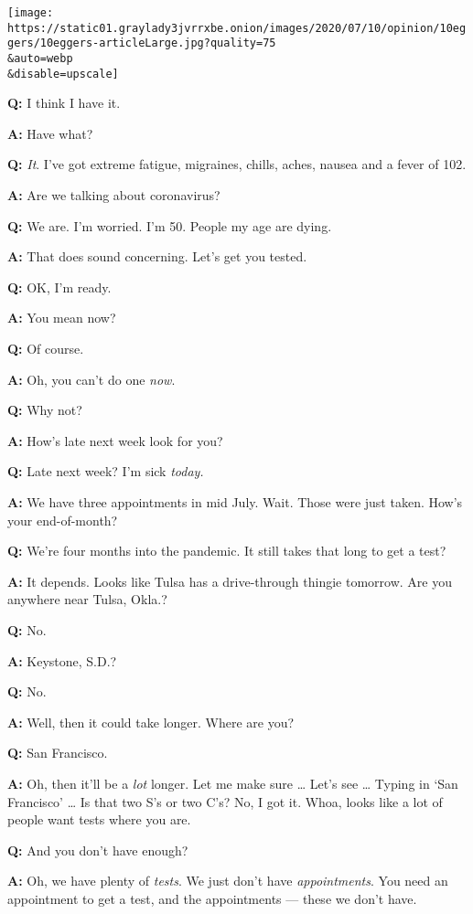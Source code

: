 \texttt{[image: https://static01.graylady3jvrrxbe.onion/images/2020/07/10/opinion/10eggers/10eggers-articleLarge.jpg?quality=75\\\&auto=webp\\\&disable=upscale]}

\textbf{Q:} I think I have it.

\textbf{A:} Have what?

\textbf{Q:} \emph{It}. I've got extreme fatigue, migraines, chills,
aches, nausea and a fever of 102.

\textbf{A:} Are we talking about coronavirus?

\textbf{Q:} We are. I'm worried. I'm 50. People my age are dying.

\textbf{A:} That does sound concerning. Let's get you tested.

\textbf{Q:} OK, I'm ready.

\textbf{A:} You mean now?

\textbf{Q:} Of course.

\textbf{A:} Oh, you can't do one \emph{now}.

\textbf{Q:} Why not?

\textbf{A:} How's late next week look for you?

\textbf{Q:} Late next week? I'm sick \emph{today.}

\textbf{A:} We have three appointments in mid July. Wait. Those were
just taken. How's your end-of-month?

\textbf{Q:} We're four months into the pandemic. It still takes that
long to get a test?

\textbf{A:} It depends. Looks like Tulsa has a drive-through thingie
tomorrow. Are you anywhere near Tulsa, Okla.?

\textbf{Q:} No.

\textbf{A:} Keystone, S.D.?

\textbf{Q:} No.

\textbf{A:} Well, then it could take longer. Where are you?

\textbf{Q:} San Francisco.

\textbf{A:} Oh, then it'll be a \emph{lot} longer. Let me make sure
\ldots{} Let's see \ldots{} Typing in `San Francisco' \ldots{} Is that
two S's or two C's? No, I got it. Whoa, looks like a lot of people want
tests where you are.

\textbf{Q:} And you don't have enough?

\textbf{A:} Oh, we have plenty of \emph{tests}. We just don't have
\emph{appointments}. You need an appointment to get a test, and the
appointments --- these we don't have.

